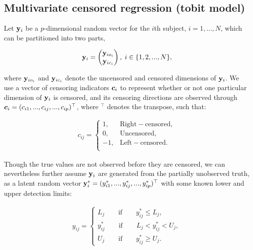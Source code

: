 \documentclass{interact}
\theoremstyle{plain}
\theoremstyle{definition}
\theoremstyle{remark}
\begin{document}
\subsection{Multivariate censored regression (tobit model)}
\label{sec:tobit}
Let $\mathbf{y}_i$ be a $p$-dimensional random vector for the $i$th subject, $i=1,\dots,N$, which can be partitioned into two parts, 
\begin{linenomath}
    \begin{align*}\mathbf{y}_i=\begin{pmatrix}
                \mathbf{y}_{io_{i}}\\
                \mathbf{y}_{ic_{i}}
            \end{pmatrix},\; i\in \{1,2,...,N\},
    \end{align*}
\end{linenomath}
where $\mathbf{y}_{io_{i}}$ and $\mathbf{y}_{ic_{i}}$ denote the uncensored and censored dimensions of $\mathbf{y}_i$. We use a vector of censoring indicators $\bm{c}_i$ to represent whether or not one particular dimension of $\mathbf{y}_i$ is censored, and its censoring directions are observed through $\bm{c}_i=(c_{i1},...,c_{ij},...,c_{ip})^\top$, where $^\top$ denotes the transpose, such that:
\begin{linenomath}
\begin{align*}
c_{ij}=  
     \begin{cases}
       1, & \mathrm{Right-censored},\\
       0, & \mathrm{Uncensored}, \\
       -1,& \mathrm{Left-censored}.\\
     \end{cases}%
\end{align*}
\end{linenomath}
Though the true values are not observed before they are censored, we can nevertheless further assume $\mathbf{y}_i$ are generated from the partially unobserved truth, as a latent random vector $\mathbf{y}_i^*=(y_{i1}^*,...,y_{ij}^*,...,y_{ip}^*)^\top$ with some known lower and upper detection limits:
\begin{linenomath}
\begin{align*}
    y_{ij}=\begin{cases}
         L_{j}\qquad    \mathrm{if}\qquad y_{ij}^*\le L_{j},  \\
         y_{ij}^*\qquad \mathrm{if}\qquad L_{j}<y_{ij}^*<U_{j},\\
         U_{j}\qquad    \mathrm{if}\qquad y_{ij}^*\ge U_{j}.
        \end{cases}
\end{align*}
\end{linenomath}
\end{document}
